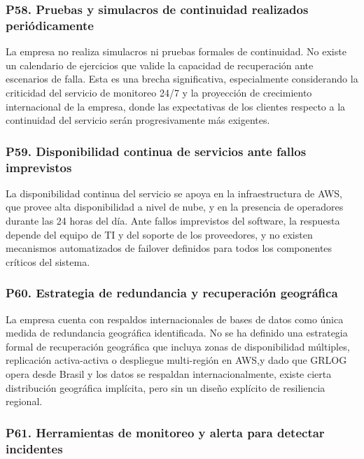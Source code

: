 \documentclass[12pt]{article}
\begin{document}
\subsubsection*{\textbf{P58. Pruebas y simulacros de continuidad realizados peri\'odicamente}}

La empresa no realiza simulacros ni pruebas formales de continuidad. No existe
un calendario de ejercicios que valide la capacidad de recuperaci\'on ante escenarios
de falla. Esta es una brecha significativa, especialmente considerando la criticidad del
servicio de monitoreo 24/7 y la proyecci\'on de crecimiento internacional de la empresa,
donde las expectativas de los clientes respecto a la continuidad del servicio ser\'an
progresivamente m\'as exigentes.

\subsubsection*{\textbf{P59. Disponibilidad continua de servicios ante fallos imprevistos}}

La disponibilidad continua del servicio se apoya en la infraestructura de AWS,
que provee alta disponibilidad a nivel de nube, y en la presencia de operadores durante
las 24 horas del d\'ia. Ante fallos imprevistos del software, la respuesta depende del
equipo de TI y del soporte de los proveedores, y no existen mecanismos automatizados de
failover definidos para todos los componentes cr\'iticos del sistema.

\subsubsection*{\textbf{P60. Estrategia de redundancia y recuperaci\'on geogr\'afica}}

La empresa cuenta con respaldos internacionales de bases de datos como \'unica
medida de redundancia geogr\'afica identificada. No se ha definido una estrategia formal
de recuperaci\'on geogr\'afica que incluya zonas de disponibilidad m\'ultiples, replicaci\'on
activa-activa o despliegue multi-regi\'on en AWS,y dado que GRLOG opera desde Brasil y
los datos se respaldan internacionalmente, existe cierta distribuci\'on geogr\'afica
impl\'icita, pero sin un dise\~no expl\'icito de resiliencia regional.

\subsubsection*{\textbf{P61. Herramientas de monitoreo y alerta para detectar incidentes}}
\end{document}
